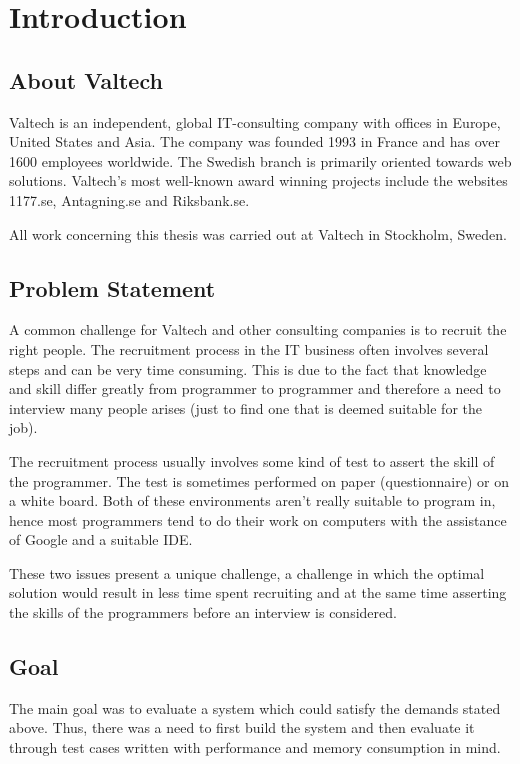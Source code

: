 \chapter{Introduction}

\section{About Valtech}
Valtech is an independent, global IT-consulting company with offices in Europe, United States and Asia. The company was founded 1993 in France and has over 1600 employees worldwide. The Swedish branch is primarily oriented towards web solutions. 
Valtech's most well-known award winning projects include the websites 1177.se, Antagning.se and Riksbank.se. 

All work concerning this thesis was carried out at Valtech in Stockholm, Sweden.

\section{Problem Statement}

A common challenge for Valtech and other consulting companies is to recruit the right people.  The recruitment process in the IT business often involves several steps and can be very time consuming. This is due to the fact that knowledge and skill differ greatly from programmer to programmer and therefore a need to interview many people arises (just to find one that is deemed suitable for the job). 

The recruitment process usually involves some kind of test to assert the skill of the programmer.  The test is sometimes performed on paper (questionnaire) or on a white board. Both of these environments aren’t really suitable to program in, hence most programmers tend to do their work on computers with the assistance of Google and a suitable IDE. 

These two issues present a unique challenge, a challenge in which the optimal solution would result in less time spent recruiting and at the same time asserting the skills of the programmers before an interview is considered.

\section{Goal}
The main goal was to evaluate a system which could satisfy the demands stated above. Thus, there was a need to first build the system and then evaluate it through test cases written with performance and memory consumption in mind. 


